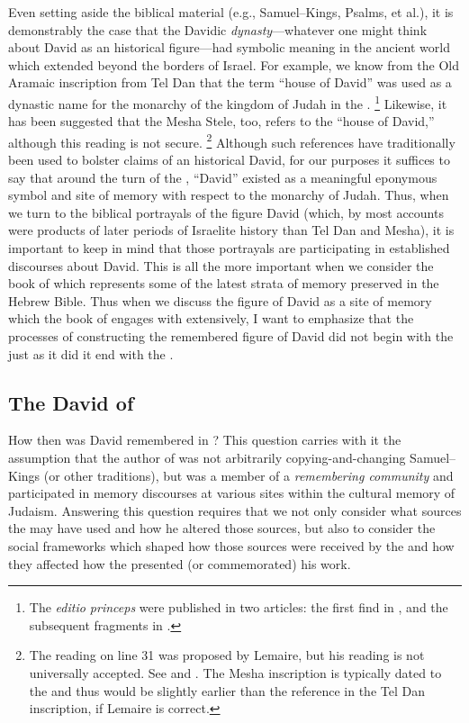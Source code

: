 Even setting aside the biblical material (e.g., Samuel--Kings, Psalms, et al.), it is demonstrably the case that the Davidic \emph{dynasty}---whatever one might think about David as an historical figure---had symbolic meaning in the ancient world which extended beyond the borders of Israel. For example, we know from the Old Aramaic inscription from Tel Dan that the term  ``house of David'' was used as a dynastic name for the monarchy of the kingdom of Judah in the .%
    \footnote{The \emph{editio princeps} were published in two articles: the first find in \cite{biran-naveh_iej1993}, and the subsequent fragments in \cite{biran-naveh_iej1995}.}
Likewise, it has been suggested that the Mesha Stele, too, refers to the ``house of David,'' although this reading is not secure.%
    \footnote{The reading  on line 31 was proposed by Lemaire, but his reading is not universally accepted. See \cite{lemaire_sel1994} and \cite{lemaire_bar1994}. The Mesha inscription is typically dated to the  and thus would be slightly earlier than the reference in the Tel Dan inscription, if Lemaire is correct.}
Although such references have traditionally been used to bolster claims of an historical David, for our purposes it suffices to say that around the turn of the , ``David'' existed as a meaningful eponymous symbol and site of memory with respect to the monarchy of Judah. Thus, when we turn to the biblical portrayals of the figure David (which, by most accounts were products of later periods of Israelite history than Tel Dan and Mesha), it is important to keep in mind that those portrayals are participating in established discourses about David. This is all the more important when we consider the book of \chronicles which represents some of the latest strata of memory preserved in the Hebrew Bible. Thus when we discuss the figure of David as a site of memory which the book of \chronicles engages with extensively, I want to emphasize that the processes of constructing the remembered figure of David did not begin with the \chronicler just as it did it end with the \chronicler.\autocite{frohlich_frohlich2019}

\subsection{The David of \chronicles}
How then was David remembered in \chronicles? This question carries with it the assumption that the author of \chronicles was not arbitrarily copying-and-changing Samuel--Kings (or other traditions), but was a member of a \emph{remembering community} and participated in memory discourses at various sites within the cultural memory of \secondtemple Judaism. Answering this question requires that we not only consider what sources the \chronicler may have used and how he altered those sources, but also to consider the social frameworks which shaped how those sources were received by the \chronicler and how they affected how the \chronicler presented (or commemorated) his work.

